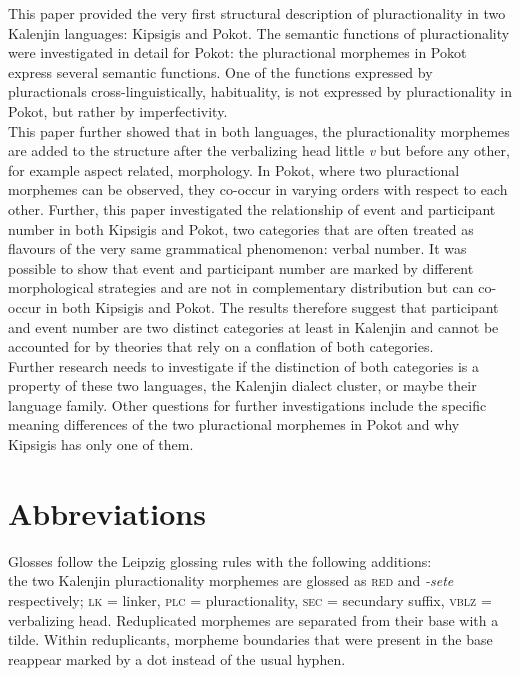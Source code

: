 \documentclass[output=paper,colorlinks,citecolor=brown
]{langscibook}
\begin{document}
This paper provided the very first structural description of pluractionality in two Kalenjin languages: Kipsigis and Pokot. The semantic functions of pluractionality were investigated in detail for Pokot: the pluractional morphemes in Pokot express several semantic functions. One of the functions expressed by pluractionals cross-linguistically, habituality, is not expressed by pluractionality in Pokot, but rather by imperfectivity. \\
This paper further showed that in both languages, the pluractionality morphemes are added to the structure after the verbalizing head little \textit{v} but before any other, for example aspect related, morphology. In Pokot, where two pluractional morphemes can be observed, they co-occur in varying orders with respect to each other. Further, this paper investigated the relationship of event and participant number in both Kipsigis and Pokot, two categories that are often treated as flavours of the very same grammatical phenomenon: verbal number. It was possible to show that event and participant number are marked by different morphological strategies and are not in complementary distribution but can co-occur in both Kipsigis and Pokot. The results therefore suggest that participant and event number are two distinct categories at least in Kalenjin and cannot be accounted for by theories that rely on a conflation of both categories.\\
Further research needs to investigate if the distinction of both categories is a property of these two languages, the Kalenjin dialect cluster, or maybe their language family. Other questions for further investigations include the specific meaning differences of the two pluractional morphemes in Pokot and why Kipsigis has only one of them. 




\section*{Abbreviations}

Glosses follow the Leipzig glossing rules with the following additions:\\ the two Kalenjin pluractionality morphemes are glossed as \textsc{red} and \textit{-sete} respectively; \textsc{lk} = linker, \textsc{plc} = pluractionality, \textsc{sec} = secundary suffix, \textsc{vblz} = verbalizing head. Reduplicated morphemes are separated from their base with a tilde. Within reduplicants, morpheme boundaries that were present in the base reappear marked by a dot instead of the usual hyphen.
\end{document}
